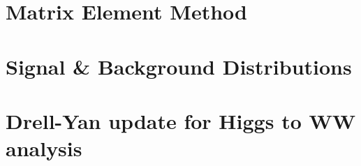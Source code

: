 \documentclass{cmspaper}
\begin{document}
  \section{Matrix Element Method}
     \label{app:matrixelement}
     
  \clearpage
  \section{Signal \& Background Distributions}
     \label{app:mvaplots}
     
  \clearpage
  \section{Drell-Yan update for Higgs to WW analysis}
     \label{app:dy_writeup}
     

  \clearpage
\end{document}
